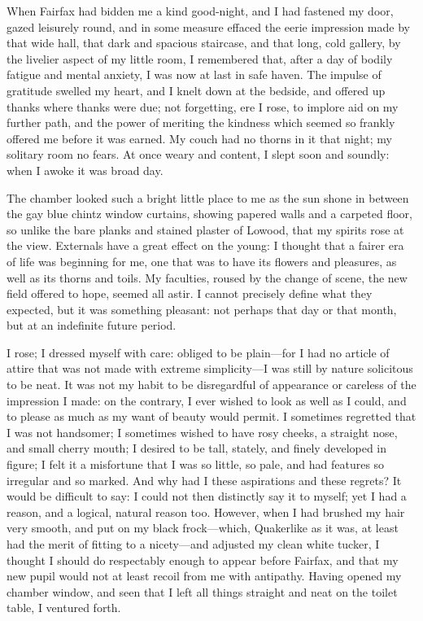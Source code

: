 When \Mrs{} Fairfax had bidden me a kind good-night, and I had fastened my
door, gazed leisurely round, and in some measure effaced the eerie
impression made by that wide hall, that dark and spacious staircase, and
that long, cold gallery, by the livelier aspect of my little room, I
remembered that, after a day of bodily fatigue and mental anxiety, I was
now at last in safe haven. The impulse of gratitude swelled my heart,
and I knelt down at the bedside, and offered up thanks where thanks were
due; not forgetting, ere I rose, to implore aid on my further path, and
the power of meriting the kindness which seemed so frankly offered me
before it was earned. My couch had no thorns in it that night; my
solitary room no fears. At once weary and content, I slept soon and
soundly: when I awoke it was broad day.

The chamber looked such a bright little place to me as the sun shone in
between the gay blue chintz window curtains, showing papered walls and a
carpeted floor, so unlike the bare planks and stained plaster of Lowood,
that my spirits rose at the view. Externals have a great effect on the
young: I thought that a fairer era of life was beginning for me, one
that was to have its flowers and pleasures, as well as its thorns and
toils. My faculties, roused by the change of scene, the new field
offered to hope, seemed all astir. I cannot precisely define what they
expected, but it was something pleasant: not perhaps that day or that
month, but at an indefinite future period.

I rose; I dressed myself with care: obliged to be plain---for I had no
article of attire that was not made with extreme simplicity---I was
still by nature solicitous to be neat. It was not my habit to be
disregardful of appearance or careless of the impression I made: on the
contrary, I ever wished to look as well as I could, and to please as
much as my want of beauty would permit. I sometimes regretted that I
was not handsomer; I sometimes wished to have rosy cheeks, a straight
nose, and small cherry mouth; I desired to be tall, stately, and finely
developed in figure; I felt it a misfortune that I was so little, so
pale, and had features so irregular and so marked. And why had I these
aspirations and these regrets? It would be difficult to say: I could
not then distinctly say it to myself; yet I had a reason, and a logical,
natural reason too. However, when I had brushed my hair very smooth,
and put on my black frock---which, Quakerlike as it was, at least had
the merit of fitting to a nicety---and adjusted my clean white tucker, I
thought I should do respectably enough to appear before \Mrs{} Fairfax,
and that my new pupil would not at least recoil from me with antipathy. 
Having opened my chamber window, and seen that I left all things
straight and neat on the toilet table, I ventured forth.

